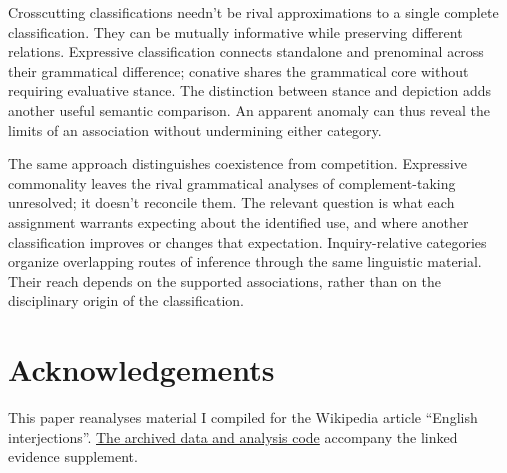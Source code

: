 \documentclass[12pt]{article}
\newif\ifblind
\begin{document}
Crosscutting classifications needn't be rival approximations to a single
complete classification. They can be mutually informative while preserving
different relations. Expressive classification connects standalone and
prenominal  across their grammatical difference; conative
 shares the grammatical core without requiring evaluative
stance. The distinction between stance and depiction adds another
useful semantic comparison. An apparent anomaly can thus reveal the
limits of an association without undermining either category.

The same approach distinguishes coexistence from competition. Expressive
commonality leaves the rival grammatical analyses of complement-taking
 unresolved; it doesn't reconcile them. The relevant
question is what each assignment warrants expecting about the identified
use, and where another classification improves or changes that expectation.
Inquiry-relative categories organize overlapping routes of inference through
the same linguistic material. Their reach depends on the supported
associations, rather than on the disciplinary origin of the classification.

\ifblind\else
\section*{Acknowledgements}

This paper reanalyses material I compiled for the Wikipedia article
\enquote{English interjections}.
\href{https://github.com/BrettRey/interjections-hpc/tree/master}{The archived
data and analysis code} accompany the linked evidence supplement.
\fi

\clearpage
\begingroup
\setlength{\emergencystretch}{3em}
\printbibliography
\endgroup
\end{document}
